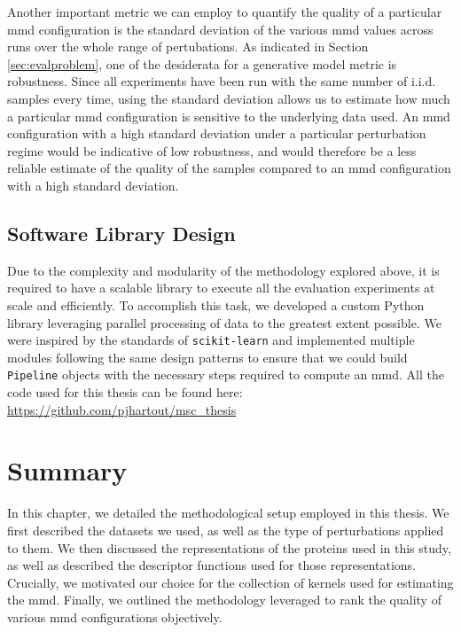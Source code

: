 Another important metric we can employ to quantify the quality of a particular
\acrshort{mmd} configuration is the standard deviation of the various
\acrshort{mmd} values across runs over the whole range of pertubations. As
indicated in Section \ref{sec:evalproblem}, one of the desiderata for a
generative model metric is robustness. Since all experiments have been run with
the same number of i.i.d. samples every time, using the standard deviation
allows us to estimate how much a particular \acrshort{mmd} configuration is sensitive
to the underlying data used. An \acrshort{mmd} configuration with a high standard
deviation under a particular perturbation regime would be indicative of low
robustness, and would therefore be a less reliable estimate of the quality of
the samples compared to an \acrshort{mmd} configuration with a high standard
deviation.


\subsection{Software Library Design}


Due to the complexity and modularity of the methodology explored above, it is
required to have a scalable library to execute all the evaluation experiments at
scale and efficiently. To accomplish this task, we developed a custom Python
library leveraging parallel processing of data to the greatest extent possible.
We were inspired by the standards of \texttt{scikit-learn} and implemented
multiple modules following the same design patterns to ensure that we could
build \texttt{Pipeline} objects with the necessary steps required to compute an
\acrshort{mmd}. All the code used for this thesis can be found here:
\url{https://github.com/pjhartout/msc_thesis}


\section{Summary}

In this chapter, we detailed the methodological setup employed in this thesis.
We first described the datasets we used, as well as the type of perturbations
applied to them. We then discussed the representations of the proteins used in
this study, as well as described the descriptor functions used for those
representations. Crucially, we motivated our choice for the collection of
kernels used for estimating the \acrshort{mmd}. Finally, we outlined the
methodology leveraged to rank the quality of various \acrshort{mmd}
configurations objectively.
